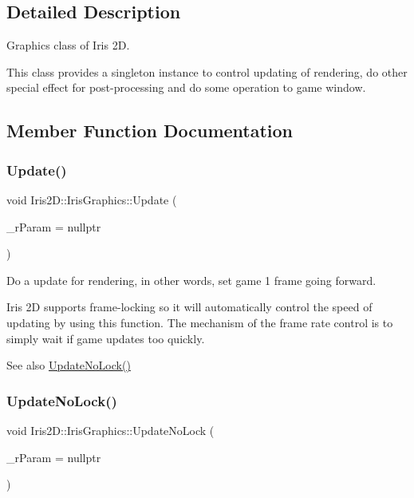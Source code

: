 \subsection{Detailed Description}
Graphics class of Iris 2D. 

This class provides a singleton instance to control updating of rendering, do other special effect for post-\/processing and do some operation to game window. 

\subsection{Member Function Documentation}
\mbox{\label{class_iris2_d_1_1_iris_graphics_aa25debfc9a08d7084f48711a6bffdc4d}} 
\subsubsection{\texorpdfstring{Update()}{Update()}}
{\footnotesize\ttfamily void Iris2\+D\+::\+Iris\+Graphics\+::\+Update (\begin{DoxyParamCaption}\item[{Iris\+Result $\ast$}]{\+\_\+r\+Param = {\ttfamily nullptr} }\end{DoxyParamCaption})}



Do a update for rendering, in other words, set game 1 frame going forward. 

Iris 2D supports frame-\/locking so it will automatically control the speed of updating by using this function. The mechanism of the frame rate control is to simply wait if game updates too quickly. \begin{DoxySeeAlso}{See also}
\hyperlink{class_iris2_d_1_1_iris_graphics_adbbca919748bfdd9b84958414debc588}{Update\+No\+Lock()} 
\end{DoxySeeAlso}
\mbox{\label{class_iris2_d_1_1_iris_graphics_adbbca919748bfdd9b84958414debc588}} 
\subsubsection{\texorpdfstring{Update\+No\+Lock()}{UpdateNoLock()}}
{\footnotesize\ttfamily void Iris2\+D\+::\+Iris\+Graphics\+::\+Update\+No\+Lock (\begin{DoxyParamCaption}\item[{Iris\+Result $\ast$}]{\+\_\+r\+Param = {\ttfamily nullptr} }\end{DoxyParamCaption})}



